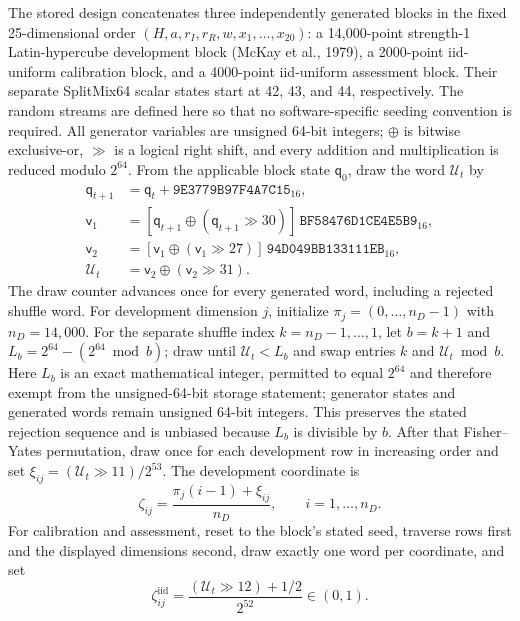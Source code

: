\documentclass[a4paper,fleqn]{cas-sc}
\begin{document}
The stored design concatenates three independently generated blocks in the fixed 25-dimensional order $(H,a,r_I,r_R,w,x_1,\ldots,x_{20})$: a 14,000-point strength-1 Latin-hypercube development block (McKay et al., 1979), a 2000-point iid-uniform calibration block, and a 4000-point iid-uniform assessment block. Their separate SplitMix64 scalar states start at 42, 43, and 44, respectively. The random streams are defined here so that no software-specific seeding convention is required. All generator variables are unsigned 64-bit integers; $\oplus$ is bitwise exclusive-or, $\gg$ is a logical right shift, and every addition and multiplication is reduced modulo $2^{64}$. From the applicable block state $\mathsf q_0$, draw the word $\mathcal U_t$ by
\begin{align}
\mathsf q_{t+1}&=\mathsf q_t+\mathtt{9E3779B97F4A7C15}_{16},\\
\mathsf v_1&=[\mathsf q_{t+1}\oplus(\mathsf q_{t+1}\gg30)]\,\mathtt{BF58476D1CE4E5B9}_{16},\\
\mathsf v_2&=[\mathsf v_1\oplus(\mathsf v_1\gg27)]\,\mathtt{94D049BB133111EB}_{16},\\
\mathcal U_t&=\mathsf v_2\oplus(\mathsf v_2\gg31).
\end{align}
The draw counter advances once for every generated word, including a rejected shuffle word. For development dimension $j$, initialize $\pi_j=(0,\ldots,n_D-1)$ with $n_D=14{,}000$. For the separate shuffle index $k=n_D-1,\ldots,1$, let $b=k+1$ and $L_b=2^{64}-(2^{64}\bmod b)$; draw until $\mathcal U_t<L_b$ and swap entries $k$ and $\mathcal U_t\bmod b$. Here $L_b$ is an exact mathematical integer, permitted to equal $2^{64}$ and therefore exempt from the unsigned-64-bit storage statement; generator states and generated words remain unsigned 64-bit integers. This preserves the stated rejection sequence and is unbiased because $L_b$ is divisible by $b$. After that Fisher--Yates permutation, draw once for each development row in increasing order and set $\xi_{ij}=(\mathcal U_t\gg11)/2^{53}$. The development coordinate is
\begin{equation}
\zeta_{ij}=\frac{\pi_j(i-1)+\xi_{ij}}{n_D},\qquad i=1,\ldots,n_D.
\end{equation}
For calibration and assessment, reset to the block's stated seed, traverse rows first and the displayed dimensions second, draw exactly one word per coordinate, and set
\begin{equation}
\zeta_{ij}^{\mathrm{iid}}=
\frac{(\mathcal U_t\gg12)+1/2}{2^{52}}\in(0,1).
\end{equation}
\end{document}

